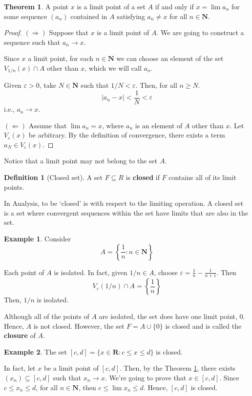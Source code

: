 \documentclass[12pt,a4paper]{article}
\theoremstyle{definition}
\newtheorem{theorem}{Theorem}[section]
\newtheorem{example}{Example}[section]
\newtheorem{definition}{Definition}[section]
\begin{document}
\begin{theorem}\label{limpointseq}
	A point $x$ is a limit point of a set $A$ if and only if $x = \lim a_n$ for some sequence $(a_n)$ contained in $A$ satisfying $a_n \neq x$ for all $n \in \textbf{N}$.
\end{theorem}

\begin{proof}
	$(\Rightarrow)$ Suppose that $x$ is a limit point of $A$. We are going to construct a sequence such that $a_n \longrightarrow x$.
	
	Since $x$ a limit point, for each $n \in \textbf{N}$ we can choose an element of the set $V_{1/n}(x) \cap A$ other than $x$, which we will call $a_n$.
	
	Given $\varepsilon > 0$, take $N \in \textbf{N}$ such that $1/N < \varepsilon$. Then, for all $n \geq N$.
	\[
		| a_n - x | < \frac{1}{N} < \varepsilon
	\]
	i.e., $a_n \longrightarrow x$.
	
	$(\Leftarrow)$ Assume that $\lim a_n = x$, where $a_n$ is an element of $A$ other than $x$. Let $V_\varepsilon(x)$ be arbitrary. By the definition of convergence, there exists a term $a_N \in V_\varepsilon(x)$.
\end{proof}

Notice that a limit point may not belong to the set $A$.

\begin{definition}[Closed set]
	A set $F \subseteq{R}$ is \textbf{closed} if $F$ contains all of its limit points.
\end{definition}

In Analysis, to be `closed' is with respect to the limiting operation. A closed set is a set where convergent sequences within the set have limits that are also in the set.

\begin{example}
	Consider
	\[
		A = \left\{ \frac{1}{n} : n \in \textbf{N} \right\}
	\]
	
	Each point of $A$ is isolated. In fact, given $1/n \in A$, choose $\varepsilon = \frac{1}{n} - \frac{1}{n+1}$. Then \[ V_\varepsilon(1/n) \cap A = \left\{ \frac{1}{n} \right\} \] Then, $1/n$ is isolated. 
	
	Although all of the points of $A$ are isolated, the set does have one limit point, $0$. Hence, $A$ is not closed. However, the set $F = A \cup \{0\}$ is closed and is called the \textbf{closure} of $A$. 
\end{example}

\begin{example}
	The set $[c,d] = \{ x \in \textbf{R} : c \leq x \leq d \}$ is closed.
	
	In fact, let $x$ be a limit point of $[c,d]$. Then, by the Theorem \ref{limpointseq}, there exists $(x_n) \subseteq [c,d]$ such that $x_n \to x$. We're going to prove that $x \in [c,d]$. Since $c \leq x_n \leq d$, for all $n \in \textbf{N}$, then $c \leq \lim x_n \leq d$. Hence, $[c,d]$ is closed.
\end{example}
\end{document}

